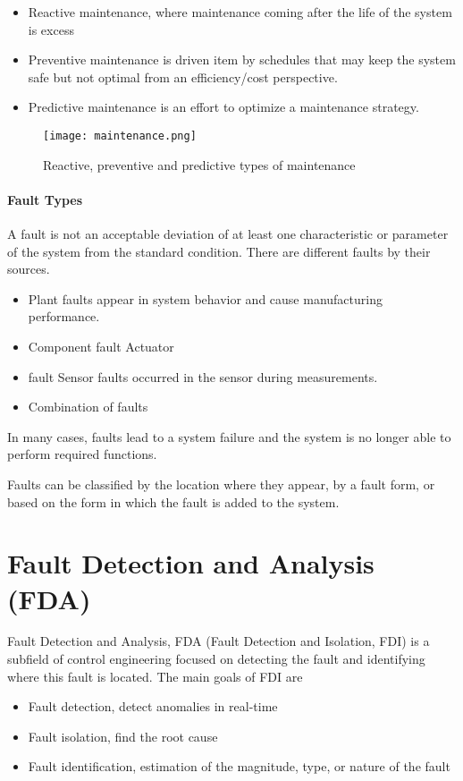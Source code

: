 \begin{itemize}
    \item Reactive maintenance, where maintenance coming after the life of
        the system is excess
    \item Preventive maintenance is driven item by
        schedules that may keep the system safe but not optimal from an
        efficiency/cost perspective. 
    \item Predictive maintenance is an
        effort to optimize a maintenance strategy.
\end{itemize}

\begin{figure}[h!]
    \centering
    \texttt{[image: maintenance.png]}
    \caption{Reactive, preventive and predictive types of maintenance}
    \label{fig:maintenance}
\end{figure}


\paragraph{Fault Types} A fault is not an acceptable deviation of at least one
characteristic or parameter of the system from the standard condition.
There are different faults by their sources. 
\begin{itemize}
    \item Plant faults appear in system
        behavior and cause manufacturing performance.
    \item Component fault Actuator
    \item fault Sensor faults occurred in the sensor during measurements.
    \item Combination of faults
\end{itemize}
In many cases, faults lead to a system failure and
the system is no longer able to perform required functions.

Faults can be classified by the location where they appear, by a fault
form, or based on the form in which the fault is added to the system.


% 

\section{Fault Detection and Analysis (FDA)}

Fault Detection and Analysis, FDA (Fault Detection and Isolation, FDI) is a
subfield of control engineering focused on detecting the fault and
identifying where this fault is located. 
The main goals of FDI are
\begin{itemize}
    \item Fault detection, detect anomalies in real-time
    \item Fault isolation, find the root cause
    \item Fault identification, estimation of the magnitude, type, or nature of
        the fault 
\end{itemize}

